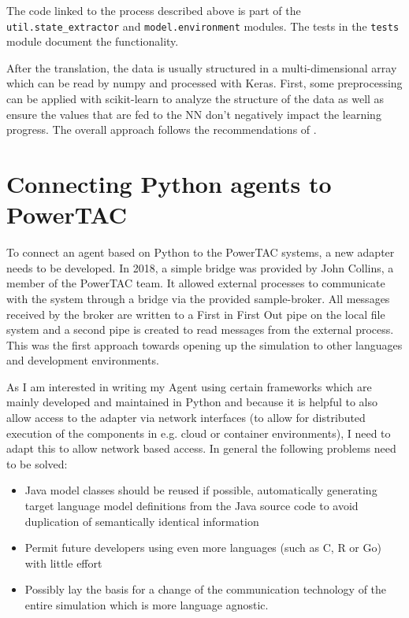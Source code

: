The code linked to the process described above is part of the \texttt{util.state\_extractor} and
\texttt{model.environment} modules. The tests in the \texttt{tests} module document the functionality.

After the translation, the data is usually structured in a multi-dimensional array which can be read by numpy and
processed with Keras. First, some preprocessing can be applied with scikit-learn to analyze the structure of the data as
well as ensure the values that are fed to the \ac {NN} don't negatively impact the learning progress. The overall
approach follows the recommendations of \citep{Goodfellow-et-al-2016}.


\section{Connecting Python agents to PowerTAC}%
\label{sec:connecting_python_agents_to_powertac}



To connect an agent based on Python to the \ac{PowerTAC} systems, a new adapter needs to be developed. In 2018, a simple
bridge was provided by John Collins, a member of the \ac {PowerTAC} team. It allowed external processes to communicate with the system through a bridge via the
provided sample-broker. All messages received by the broker are written to a First in First Out pipe on the local file
system and a second pipe is created to read messages from the external process. This was the first approach towards
opening up the simulation to other languages and development environments.


As I am interested in writing my Agent using certain frameworks which are mainly developed and maintained in Python and
because it is helpful to also allow access to the adapter via network interfaces (to allow for distributed execution of
the components in e.g. cloud or container environments), I need to adapt this to allow network based access. In general
the following problems need to be solved:

\begin{itemize}
    \item Java model classes should be reused if possible, automatically generating target language model
        definitions from the Java source code to avoid duplication of semantically identical information
    \item Permit
        future developers using even more languages (such as C, R or Go) with little effort
    \item Possibly lay the basis
        for a change of the communication technology of the entire simulation which is more language agnostic.
\end{itemize}

